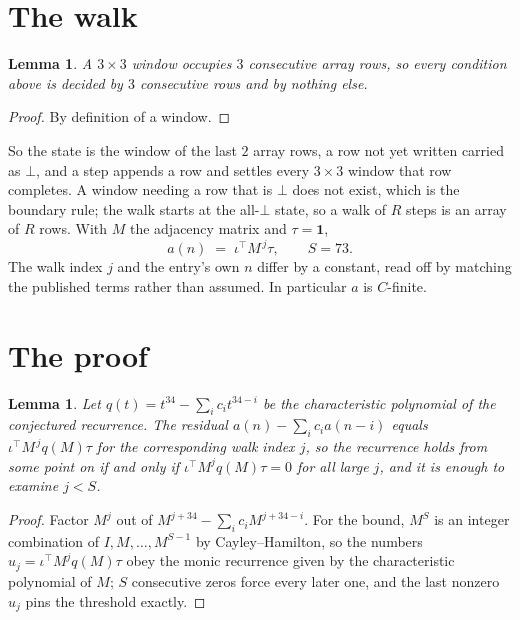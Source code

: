 \documentclass[11pt,a4paper]{article}
\theoremstyle{plain}
\newtheorem{lemma}[theorem]{Lemma}
\theoremstyle{definition}
\begin{document}
\section{The walk}

\begin{lemma}\label{lem:win}
A $3\times3$ window occupies $3$ consecutive array rows, so every condition above is
decided by $3$ consecutive rows and by nothing else.
\end{lemma}

\begin{proof}
By definition of a window.
\end{proof}

So the state is the window of the last $2$ array rows, a row not yet written carried as
$\bot$, and a step appends a row and settles every $3\times3$ window that row completes. A
window needing a row that is $\bot$ does not exist, which is the boundary rule; the walk starts
at the all-$\bot$ state, so a walk of $R$ steps is an array of $R$ rows. With $M$ the adjacency
matrix and $\tau=\mathbf{1}$,
\[
a(n)\;=\;\iota^{\!\top}M^{\,j}\tau ,\qquad S=73.
\]
The walk index $j$ and the entry's own $n$ differ by a constant, read off by matching the
published terms rather than assumed. In particular $a$ is $C$-finite.

\section{The proof}

\begin{lemma}\label{lem:crit}
Let $q(t)=t^{34}-\sum_i c_it^{34-i}$ be the characteristic polynomial of the
conjectured recurrence. The residual $a(n)-\sum_ic_ia(n-i)$ equals
$\iota^{\!\top}M^{\,j}q(M)\tau$ for the corresponding walk index $j$, so the recurrence
holds from some point on if and only if $\iota^{\!\top}M^{j}q(M)\tau=0$ for all large $j$,
and it is enough to examine $j<S$.
\end{lemma}

\begin{proof}
Factor $M^{j}$ out of $M^{j+34}-\sum_ic_iM^{j+34-i}$. For the bound, $M^{S}$
is an integer combination of $I,M,\dots,M^{S-1}$ by Cayley--Hamilton, so the numbers
$u_j=\iota^{\!\top}M^{j}q(M)\tau$ obey the monic recurrence given by the characteristic
polynomial of $M$; $S$ consecutive zeros force every later one, and the last nonzero $u_j$
pins the threshold exactly.
\end{proof}
\end{document}

